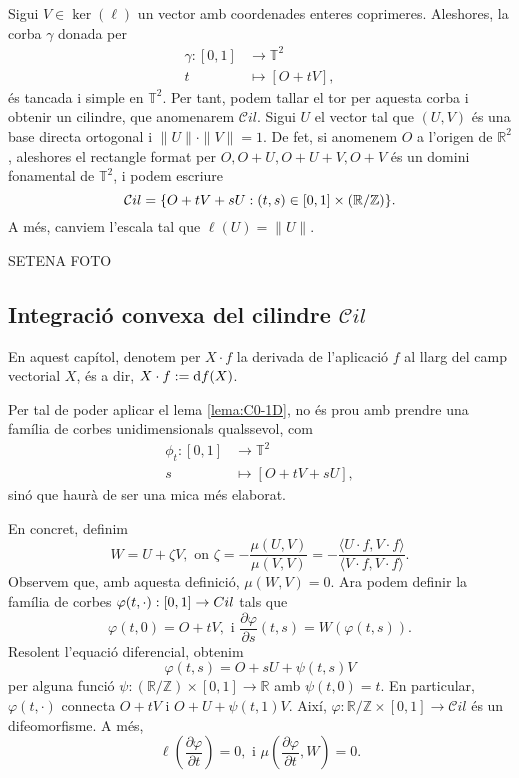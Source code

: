 Sigui $V\in\ker(\ell)$ un vector amb coordenades enteres coprimeres. Aleshores, la corba $\gamma$ donada per 
\begin{align}
    \nonumber\gamma:[0,1]&\to\mathbb T^2\\
    \nonumber t&\mapsto [O+tV],
\end{align}
és tancada i simple en $\mathbb T^2$. Per tant, podem tallar el tor per aquesta corba i obtenir un cilindre, que anomenarem $\mathcal Cil$. Sigui $U$ el vector tal que $(U,V)$ és una base directa ortogonal i $\|U\|\cdot\|V\|=1$. De fet, si anomenem $O$ a l'origen de $\mathbb R^2$, aleshores el rectangle format per $O, O+U, O+U+V, O+V$ és un domini fonamental de $\mathbb T^2$, i podem escriure 
\begin{equation*}
    \mathcal Cil = \{O+tV+sU : (t,s)\in[0,1]\times(\mathbb R / \mathbb Z)\}.
\end{equation*}
A més, canviem l'escala tal que $\ell(U)=\|U\|$.

{\color{blue} SETENA FOTO}

\subsection{Integració convexa del cilindre $\mathcal Cil$}
\begin{nota}
    En aquest capítol, denotem per $X\cdot f$ la derivada de l'aplicació $f$ al llarg del camp vectorial $X$, és a dir, $X\cdot f := \text df(X)$.
\end{nota}
Per tal de poder aplicar el lema \ref{lema:C0-1D}, no és prou amb prendre una família de corbes unidimensionals qualssevol, com
\begin{align}
    \nonumber\phi_t:[0,1]&\to\mathbb T^2\\
    \nonumber s&\mapsto [O+tV+sU],
\end{align}
sinó que haurà de ser una mica més elaborat. 

En concret, definim 
\begin{equation*}
    W=U+\zeta V, \text{ on } \zeta = -\frac{\mu(U,V)}{\mu(V,V)} = -\frac{\langle U\cdot f, V\cdot f\rangle}{\langle V\cdot f, V\cdot f\rangle}.
\end{equation*}
Observem que, amb aquesta definició, $\mu(W,V)=0$. Ara podem definir la família de corbes $\varphi(t,\cdot):[0,1]\to\mathbb \mathcal Cil$ tals que 
\begin{equation*}
    \varphi(t,0) = O + tV, \text{ i } \frac{\partial\varphi}{\partial s}(t,s) = W(\varphi(t,s)).
\end{equation*}
Resolent l'equació diferencial, obtenim
\begin{equation*}
    \varphi(t,s) = O + sU + \psi(t,s)V
\end{equation*}
per alguna funció $\psi:(\mathbb R/\mathbb Z)\times[0,1]\to\mathbb R$ amb $\psi(t,0)=t$. En particular, $\varphi(t,\cdot)$ connecta $O+tV$ i $O+U+\psi(t,1)V$. Així, $\varphi:\mathbb R/\mathbb Z\times[0,1]\to\mathcal Cil$ és un difeomorfisme. A més, 
\begin{equation*}
    \ell\left( \frac{\partial\varphi}{\partial t} \right) = 0, \text{ i } \mu\left( \frac{\partial\varphi}{\partial t}, W \right) = 0.
\end{equation*}

